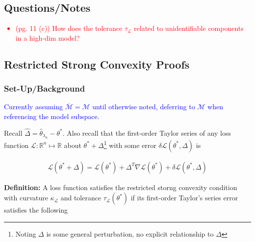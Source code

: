 \documentclass[11pt]{article}
\begin{document}
\subsection*{Questions/Notes}
\textcolor{red}{
	\begin{itemize}
		\item (pg. 11 (c)) How does the tolerance $\tau_\mathcal{L}$ related to unidentifiable components in a high-dim model? 
	\end{itemize}
}
	
\newpage 
\subsection*{Restricted Strong Convexity Proofs}

\subsubsection{Set-Up/Background}

\textcolor{blue}{Currently assuming $\overline{\mathcal{M}}=\mathcal{M}$ until otherwise noted, deferring to $\mathcal{M}$ when referencing the model subspace.}\newline 

Recall $\hat\Delta = \hat{\theta}_{\lambda_n} - \theta^*$. Also recall that the first-order Taylor series of any loss function  $\mathcal{L}: \mathbb{R}^n \mapsto \mathbb{R}$ about $\theta^* + \Delta$\footnote{Noting $\Delta$ is some general perturbation, no explicit relationship to $\hat\Delta$} with some error $\delta \mathcal{L}(\theta^*, \Delta)$ is

\begin{gather*}
    \mathcal{L}(\theta^* + \Delta)
    =
    \mathcal{L}(\theta^*)
    +
    \Delta^T\nabla\mathcal{L}(\theta^*)
    +
    \delta \mathcal{L}(\theta^*, \Delta)
\end{gather*}

%

{\bf Definition:} A loss function satisfies the restricted storng convexity condition with curvature $\kappa_\mathcal{L}$ and tolerance $\tau_{\mathcal{L}}(\theta^*)$ if its first-order Taylor's series error satisfies the following
\end{document}
